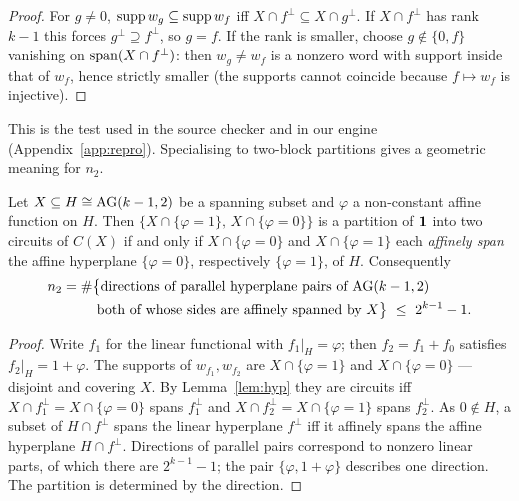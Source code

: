 \begin{proof}
For $g\ne0$, $\operatorname{supp} w_g\subseteq\operatorname{supp} w_f$ iff $X\cap f^\perp\subseteq X\cap g^\perp$. If $X\cap f^\perp$ has rank $k-1$ this forces $g^\perp\supseteq f^\perp$, so $g=f$. If the rank is smaller, choose $g\notin\{0,f\}$ vanishing on $\operatorname{span}(X\cap f^\perp)$: then $w_g\ne w_f$ is a nonzero word with support inside that of $w_f$, hence strictly smaller (the supports cannot coincide because $f\mapsto w_f$ is injective).
\end{proof}

This is the test used in the source checker and in our engine (Appendix~\ref{app:repro}). Specialising to two-block partitions gives a geometric meaning for $n_2$.

\begin{proposition}\label{prop:geo-n2}
Let $X\subseteq H\cong\mathrm{AG}(k-1,2)$ be a spanning subset and $\varphi$ a non-constant affine function on $H$. Then $\{X\cap\{\varphi=1\},\,X\cap\{\varphi=0\}\}$ is a partition of $\mathbf 1$ into two circuits of $C(X)$ if and only if $X\cap\{\varphi=0\}$ and $X\cap\{\varphi=1\}$ each \emph{affinely span} the affine hyperplane $\{\varphi=0\}$, respectively $\{\varphi=1\}$, of $H$. Consequently
\[
\begin{aligned}n_2&=\#\bigl\{\text{directions of parallel hyperplane pairs of }\AG(k-1,2)\\&\hphantom{=\#\bigl\{}\text{both of whose sides are affinely spanned by }X\bigr\}\ \le\ 2^{k-1}-1 .\end{aligned}
\]
\end{proposition}

\begin{proof}
Write $f_1$ for the linear functional with $f_1|_H=\varphi$; then $f_2=f_1+f_0$ satisfies $f_2|_H=1+\varphi$. The supports of $w_{f_1},w_{f_2}$ are $X\cap\{\varphi=1\}$ and $X\cap\{\varphi=0\}$ — disjoint and covering $X$. By Lemma~\ref{lem:hyp} they are circuits iff $X\cap f_1^\perp=X\cap\{\varphi=0\}$ spans $f_1^\perp$ and $X\cap f_2^\perp=X\cap\{\varphi=1\}$ spans $f_2^\perp$. As $0\notin H$, a subset of $H\cap f^\perp$ spans the linear hyperplane $f^\perp$ iff it affinely spans the affine hyperplane $H\cap f^\perp$. Directions of parallel pairs correspond to nonzero linear parts, of which there are $2^{k-1}-1$; the pair $\{\varphi,1+\varphi\}$ describes one direction. The partition is determined by the direction.
\end{proof}


